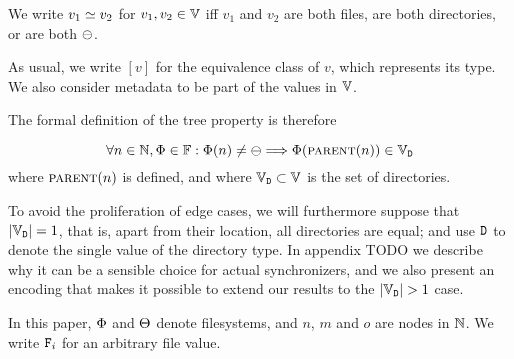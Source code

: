 \begin{mydef}
We write $v_1\simeq v_2$ for $v_1,v_2\in\mathbb{V}$ iff $v_1$ and $v_2$ are both files,
are both directories, or are both $\ominus$.
\end{mydef}

As usual, we write $[v]$ for the equivalence class of $v$, which represents its type.
We also consider metadata to be part of the values in $\mathbb{V}$.

The formal definition of the tree property is therefore
\begin{mydef}
\[ \forall n\in\mathbb{N}, \Phi\in\mathbb{F}: \Phi(n) \neq \ominus \Longrightarrow \Phi(\text{\normalfont\scshape{parent}}(n)) \in \mathbb{V}_{\mathtt{D}} \]
where $\text{\normalfont\scshape{parent}}(n)$ is defined, and where $\mathbb{V}_{\mathtt{D}}\subset\mathbb{V}$ is the set of directories.
\end{mydef}

To avoid the proliferation of edge cases, we will furthermore suppose that
$|\mathbb{V}_{\mathtt{D}}|=1$, that is, apart from their location, all directories are equal;
and use $\mathtt{D}$ to denote the single value of the directory type.
In appendix TODO we describe why it can be a sensible choice
for actual synchronizers, and we also present an encoding that makes it possible
to extend our results to the $|\setd|>1$ case.



% 
% 

In this paper, $\Phi$ and $\Theta$ denote filesystems,
and $n$, $m$ and $o$ are nodes in $\mathbb{N}$.
We write $\mathtt{F}_i$ for an arbitrary file value. %

